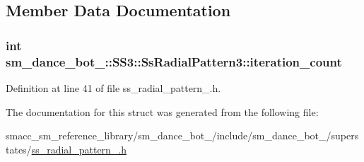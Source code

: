 \subsection{Member Data Documentation}
\subsubsection[{\texorpdfstring{iteration\+\_\+count}{iteration_count}}]{\setlength{\rightskip}{0pt plus 5cm}int sm\+\_\+dance\+\_\+bot\+\_\+::\+S\+S3\+::\+Ss\+Radial\+Pattern3\+::iteration\+\_\+count}\hypertarget{structsm__dance__bot__3_1_1SS3_1_1SsRadialPattern3_a83ff2f4fce867bf0cfb53ec61fc37212}{}\label{structsm__dance__bot__3_1_1SS3_1_1SsRadialPattern3_a83ff2f4fce867bf0cfb53ec61fc37212}


Definition at line 41 of file ss\+\_\+radial\+\_\+pattern\+\_.\+h.



The documentation for this struct was generated from the following file\+:\begin{DoxyCompactItemize}
\item 
smacc\+\_\+sm\+\_\+reference\+\_\+library/sm\+\_\+dance\+\_\+bot\+\_/include/sm\+\_\+dance\+\_\+bot\+\_/superstates/\hyperlink{3_2include_2sm__dance__bot__3_2superstates_2ss__radial__pattern__3_8h}{ss\+\_\+radial\+\_\+pattern\+\_.\+h}\end{DoxyCompactItemize}
